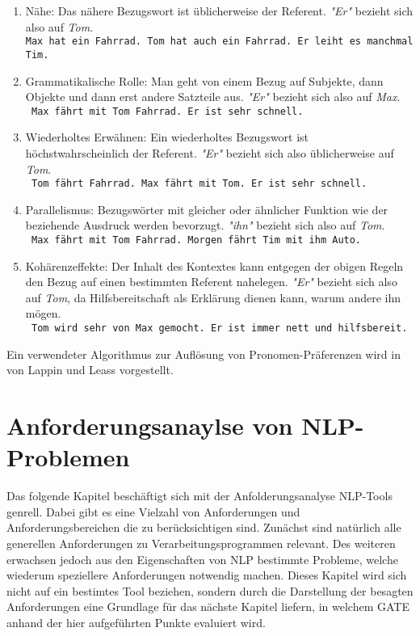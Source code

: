 \documentclass[12pt]{report}
\begin{document}
\begin{enumerate}
\item Nähe: Das nähere Bezugswort ist üblicherweise der Referent. \textit{"Er"} bezieht sich also auf \textit{Tom}.\\
\tt Max hat ein Fahrrad. Tom hat auch ein Fahrrad. Er leiht es manchmal Tim.
\rm
\item Grammatikalische Rolle: Man geht von einem Bezug auf Subjekte, dann Objekte und dann erst andere Satzteile aus. \textit{"Er"} bezieht sich also auf \textit{Max}.\\
\tt
Max fährt mit Tom Fahrrad. Er ist sehr schnell.
\rm
\item Wiederholtes Erwähnen: Ein wiederholtes Bezugswort ist höchstwahrscheinlich der Referent. \textit{"Er"} bezieht sich also üblicherweise auf \textit{Tom}.\\
\tt
Tom fährt Fahrrad. Max fährt mit Tom. Er ist sehr schnell.
\rm
\item Parallelismus: Bezugswörter mit gleicher oder ähnlicher Funktion wie der beziehende Ausdruck werden bevorzugt. \textit{"ihn"} bezieht sich also auf \textit{Tom}. \\
\tt
Max fährt mit Tom Fahrrad. Morgen fährt Tim mit ihm Auto.
\rm
\item Kohärenzeffekte: Der Inhalt des Kontextes kann entgegen der obigen Regeln den Bezug auf einen bestimmten Referent nahelegen. \textit{"Er"} bezieht sich also auf \textit{Tom}, da Hilfsbereitschaft als Erklärung dienen kann, warum andere ihn mögen.\\
\tt
Tom wird sehr von Max gemocht. Er ist immer nett und hilfsbereit.
\rm
\end{enumerate}
Ein verwendeter Algorithmus zur Auflösung von Pronomen-Präferenzen wird in \cite{ll94} von Lappin und Leass vorgestellt.\\

\chapter{Anforderungsanaylse von NLP-Problemen}
Das folgende Kapitel beschäftigt sich mit der Anfolderungsanalyse NLP-Tools genrell. Dabei gibt es eine Vielzahl von Anforderungen und Anforderungsbereichen die zu berücksichtigen sind. Zunächst sind natürlich alle generellen Anforderungen zu Verarbeitungsprogrammen relevant. Des weiteren erwachsen jedoch aus den Eigenschaften von NLP bestimmte Probleme, welche wiederum speziellere Anforderungen notwendig machen. Dieses Kapitel wird sich nicht auf ein bestimtes Tool beziehen, sondern durch die Darstellung der besagten Anforderungen eine Grundlage für das nächste Kapitel liefern, in welchem GATE anhand der hier aufgeführten Punkte evaluiert wird. 
\end{document}
